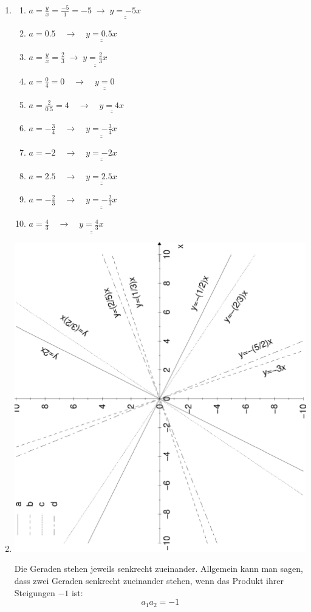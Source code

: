 \documentclass[%
11pt,%
twoside,%
titlepage,%
german,%
headsepline%
]{scrartcl}
\newcommand{\result}[1]{\underline{\underline{#1}}}
\begin{document}
{{\begin{enumerate}
\item
  \begin{enumerate}
  \item $\displaystyle a=\frac{y}{x}=\frac{-5}{1}=-5 \;\rightarrow\; \result{y=-5x}$
  \item $\displaystyle a=0.5 \quad\rightarrow\quad \result{y=0.5x}$
  \item $\displaystyle a=\frac{y}{x}=\frac{2}{3} \;\rightarrow\; \result{y=\frac{2}{3}x}$
  \item $\displaystyle a=\frac{0}{4}=0 \quad\rightarrow\quad \result{y=0}$
  \item $\displaystyle a=\frac{2}{0.5}=4 \quad\rightarrow\quad \result{y=4x}$
  \item $\displaystyle a=-\frac{3}{4} \quad\rightarrow\quad \result{y=-\frac{3}{4}x}$
  \item $\displaystyle a=-2 \quad\rightarrow\quad \result{y=-2x}$
  \item $\displaystyle a=2.5 \quad\rightarrow\quad \result{y=2.5x}$
  \item $\displaystyle a=-\frac{2}{3} \quad\rightarrow\quad \result{y=-\frac{2}{3}x}$
  \item $\displaystyle a=\frac{4}{3} \quad\rightarrow\quad \result{y=\frac{4}{3}x}$
  \end{enumerate}

\item \mbox{}\vspace*{-2\baselineskip}
\begin{center}
\includegraphics[angle=-90,width=\linewidth]{pictures/perp.eps}
\end{center}
Die Geraden stehen jeweils senkrecht zueinander. Allgemein kann man sagen, dass zwei Geraden senkrecht zueinander stehen, wenn das Produkt ihrer Steigungen $-1$ ist:
\begin{displaymath}
  a_1 a_2 = -1
\end{displaymath}


\end{enumerate}}}
\end{document}
